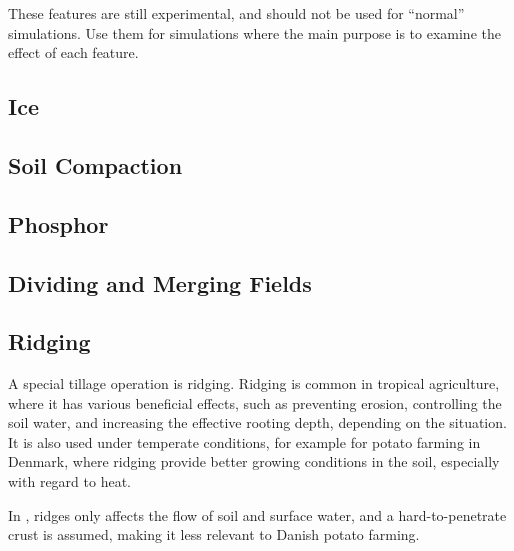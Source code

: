 \documentclass[a4paper,11pt]{article}
\begin{document}
These features are still experimental, and should not be used for
``normal'' simulations.  Use them for simulations where the main
purpose is to examine the effect of each feature.

\subsection{Ice}
\label{sec:ice}


\subsection{Soil Compaction}
\label{sec:compact}


\subsection{Phosphor}
\label{sec:phosphor}


\subsection{Dividing and Merging Fields}
\label{sec:divide}


\subsection{Ridging}

A special tillage operation is ridging.  Ridging is common in tropical
agriculture, where it has various beneficial effects, such as
preventing erosion, controlling the soil water, and increasing the
effective rooting depth, depending on the situation.  It is also used
under temperate conditions, for example for potato farming in Denmark,
where ridging provide better growing conditions in the soil,
especially with regard to heat.

In \daisy{}, ridges only affects the flow of soil and surface water,
and a hard-to-penetrate crust is assumed, making it less relevant to
Danish potato farming.
\end{document}
